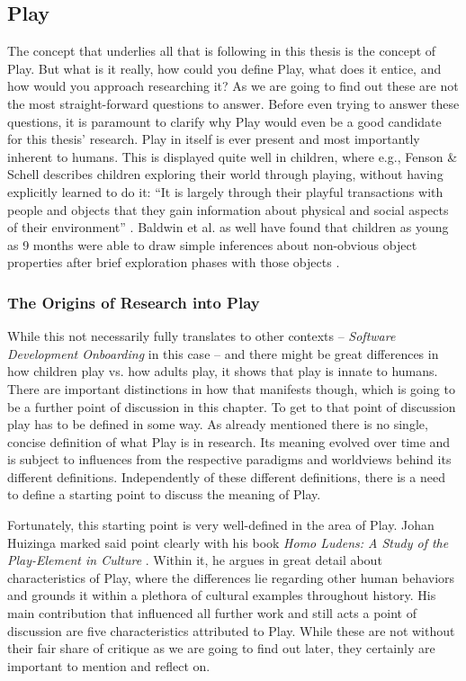 \subsection{Play}

The concept that underlies all that is following in this thesis is the concept of Play. But what is it really, how could you define Play, what does it entice, and how would you approach researching it? As we are going to find out these are not the most straight-forward questions to answer. Before even trying to answer these questions, it is paramount to clarify why Play would even be a good candidate for this thesis' research. Play in itself is ever present and most importantly inherent to humans. This is displayed quite well in children, where e.g., Fenson \& Schell describes children exploring their world through playing, without having explicitly learned to do it: \enquote{It is largely through their playful transactions with people and objects that they gain information about physical and social aspects of their environment} \cite{fenson1985origins}. Baldwin et al. as well have found that children as young as 9 months were able to draw simple inferences about non-obvious object properties after brief exploration phases with those objects \cite{baldwin1993infants}.

\subsubsection{The Origins of Research into Play}

While this not necessarily fully translates to other contexts -- \textit{Software Development Onboarding} in this case -- and there might be great differences in how children play vs. how adults play, it shows that play is innate to humans. There are important distinctions in how that manifests though, which is going to be a further point of discussion in this chapter. To get to that point of discussion play has to be defined in some way. As already mentioned there is no single, concise definition of what Play is in research. Its meaning evolved over time and is subject to influences from the respective paradigms and worldviews behind its different definitions. Independently of these different definitions, there is a need to define a starting point to discuss the meaning of Play.

Fortunately, this starting point is very well-defined in the area of Play. Johan Huizinga marked said point clearly with his book \textit{Homo Ludens: A Study of the Play-Element in Culture} \cite{huizinga2020homo}. Within it, he argues in great detail about characteristics of Play, where the differences lie regarding other human behaviors and grounds it within a plethora of cultural examples throughout history. His main contribution that influenced all further work and still acts a point of discussion are five characteristics attributed to Play. While these are not without their fair share of critique as we are going to find out later, they certainly are important to mention and reflect on.

